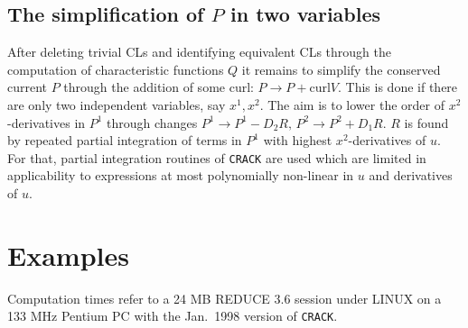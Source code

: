 \subsection{The simplification of $P$ in two variables}
After deleting trivial CLs and identifying equivalent CLs
through the computation of characteristic functions $Q$ it remains
to simplify the conserved current $P$ through the addition of
some curl: $P \rightarrow P+\mbox{curl} V$.
This is done if there are only two independent
variables, say $x^1,x^2$. The aim is to lower the order of
$x^2$-derivatives in $P^1$ through changes $P^1 \rightarrow P^1 - D_2 R,\,
P^2 \rightarrow P^2 + D_1 R$. $R$ is found by repeated
partial integration of terms in $P^1$ with highest $x^2$-derivatives
of $u$. For that, partial integration routines of {\tt CRACK} are
used which are limited in applicability
to expressions at most polynomially non-linear
in $u$ and derivatives of $u$.

\section{Examples}
Computation times refer to a 24 MB REDUCE 3.6 session under LINUX
on a 133 MHz Pentium PC with the Jan.\ 1998 version of {\tt CRACK}.

